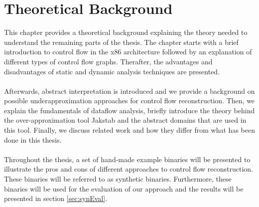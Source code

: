 \documentclass{kththesis}
\newcommand{\fbcomment}[1]{{#1}}
\renewcommand{\fbcomment}[1]{}
\begin{document}
\chapter{Theoretical Background}\label{chap:background}
\fbcomment{\color{red}Goal: Provide enough background information to understand the concepts of the thesis and give the thesis context.}
This chapter provides a theoretical background explaining the theory needed to understand the remaining parts of the thesis. The chapter starts with a brief introduction to control flow in the x86 architecture followed by an explanation of different types of control flow graphs. Therafter, the advantages and disadvantages of static and dynamic analysis techniques are presented. 
\\ \\
Afterwards, abstract interpretation is introduced and we provide a background on possible underapproximation approaches for control flow reconstruction. Then, we explain the fundamentals of dataflow analysis, briefly introduce the theory behind the over-approximation tool Jakstab and the abstract domains that are used in this tool. Finally, we discuss related work and how they differ from what has been done in this thesis.
\\ \\
Throughout the thesis, a set of hand-made example binaries will be presented to illustrate the pros and cons of different approaches to control flow reconstruction. These binaries will be referred to as synthetic binaries. Furthermore, these binaries will be used for the evaluation of our approach and the results will be presented in section \ref{sec:synEval}.

\clearpage
\end{document}
